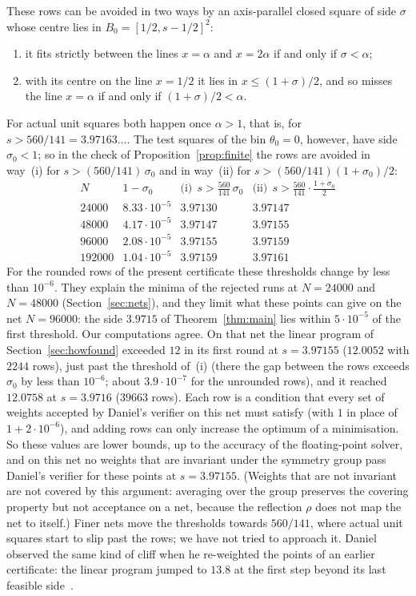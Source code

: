 \documentclass[11pt]{amsart}
\theoremstyle{definition}
\theoremstyle{remark}
\newcommand{\sdec}{3.9715}
\begin{document}
These rows can be avoided in two ways by an axis-parallel closed square of side $\sigma$ whose centre lies in $B_0=[1/2,s-1/2]^2$:
\begin{enumerate}
\item[(i)] it fits strictly between the lines $x=\alpha$ and $x=2\alpha$ if and only if $\sigma<\alpha$;
\item[(ii)] with its centre on the line $x=1/2$ it lies in $x\le(1+\sigma)/2$, and so misses the line $x=\alpha$ if and only if $(1+\sigma)/2<\alpha$.
\end{enumerate}
For actual unit squares both happen once $\alpha>1$, that is, for $s>560/141=3.97163\ldots$. The test squares of the bin $\theta_0=0$, however, have side $\sigma_0<1$; so in the check of Proposition~\ref{prop:finite} the rows are avoided in way~(i) for $s>(560/141)\,\sigma_0$ and in way~(ii) for $s>(560/141)(1+\sigma_0)/2$:
\[
  \begin{array}{rccc}
    N & 1-\sigma_0 & \text{(i)}\ \ s>\frac{560}{141}\,\sigma_0 & \text{(ii)}\ \ s>\frac{560}{141}\cdot\frac{1+\sigma_0}{2}\\[3pt]
    24000 & 8.33\cdot10^{-5} & 3.97130 & 3.97147\\
    48000 & 4.17\cdot10^{-5} & 3.97147 & 3.97155\\
    96000 & 2.08\cdot10^{-5} & 3.97155 & 3.97159\\
    192000 & 1.04\cdot10^{-5} & 3.97159 & 3.97161
  \end{array}
\]
For the rounded rows of the present certificate these thresholds change by less than $10^{-6}$. They explain the minima of the rejected runs at $N=24000$ and $N=48000$ (Section~\ref{sec:nets}), and they limit what these points can give on the net $N=96000$: the side $\sdec$ of Theorem~\ref{thm:main} lies within $5\cdot10^{-5}$ of the first threshold. Our computations agree. On that net the linear program of Section~\ref{sec:howfound} exceeded $12$ in its first round at $s=3.97155$ ($12.0052$ with $2244$ rows), just past the threshold of~(i) (there the gap between the rows exceeds $\sigma_0$ by less than $10^{-6}$; about $3.9\cdot10^{-7}$ for the unrounded rows), and it reached $12.0758$ at $s=3.9716$ ($39663$ rows). Each row is a condition that every set of weights accepted by Daniel's verifier on this net must satisfy (with $1$ in place of $1+2\cdot10^{-6}$), and adding rows can only increase the optimum of a minimisation. So these values are lower bounds, up to the accuracy of the floating-point solver, and on this net no weights that are invariant under the symmetry group pass Daniel's verifier for these points at $s=3.97155$. (Weights that are not invariant are not covered by this argument: averaging over the group preserves the covering property but not acceptance on a net, because the reflection $\rho$ does not map the net to itself.) Finer nets move the thresholds towards $560/141$, where actual unit squares start to slip past the rows; we have not tried to approach it. Daniel observed the same kind of cliff when he re-weighted the points of an earlier certificate: the linear program jumped to $13.8$ at the first step beyond its last feasible side~\cite[\texttt{s12/search/TIGHTEN.md}]{Dan26}.
\end{document}
